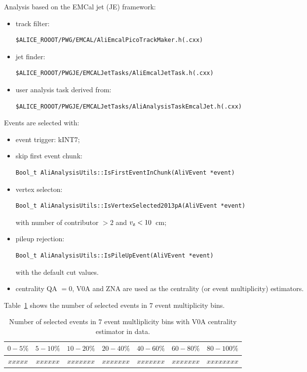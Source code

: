 Analysis based on the EMCal jet (JE) framework:
\begin{itemize}
\item track filter:
      \begin{lstlisting}
$ALICE_ROOOT/PWG/EMCAL/AliEmcalPicoTrackMaker.h(.cxx)
      \end{lstlisting}
\item jet finder:
      \begin{lstlisting}
$ALICE_ROOOT/PWGJE/EMCALJetTasks/AliEmcalJetTask.h(.cxx)
      \end{lstlisting}
\item user analysis task derived from:
      \begin{lstlisting}
$ALICE_ROOOT/PWGJE/EMCALJetTasks/AliAnalysisTaskEmcalJet.h(.cxx)
      \end{lstlisting}
\end{itemize}
Events are selected with:
\begin{itemize}
\item event trigger: kINT7;
\item skip first event chunk:
      \begin{lstlisting}
Bool_t AliAnalysisUtils::IsFirstEventInChunk(AliVEvent *event)
      \end{lstlisting}
\item vertex selecton:
      \begin{lstlisting}
Bool_t AliAnalysisUtils::IsVertexSelected2013pA(AliVEvent *event)
      \end{lstlisting}
      with number of contributor $>2$ and $v_{\rm z}<10$~cm;
\item pileup rejection:
      \begin{lstlisting}
Bool_t AliAnalysisUtils::IsPileUpEvent(AliVEvent *event)
      \end{lstlisting}
      with the default cut values.
\item centrality QA $=0$, V0A and ZNA are used as the
      centrality (or event multiplicity) estimators.
\end{itemize}
Table~\ref{tab:c02NumSelEvRD} shows the number of selected
events in $7$ event multiplicity bins.

\begin{table}[htdp]
\begin{center}
\begin{tabular}{|c|c|c|c|c|c|c|}
\hline
$0-5\%$ & $5-10\%$ & $10-20\%$ & $20-40\%$ &
                     $40-60\%$ & $60-80\%$ & $80-100\%$ \\
\hline
$xxxxx$ & $xxxxxx$ & $xxxxxxx$ & $xxxxxxx$ &
                     $xxxxxxx$ & $xxxxxxx$ & $xxxxxxxx$ \\
\hline
\end{tabular}
\end{center}
\caption{Number of selected events in $7$ event multliplicity bins with
         V0A centrality estimator in data.}
\label{tab:c02NumSelEvRD}
\end{table}

